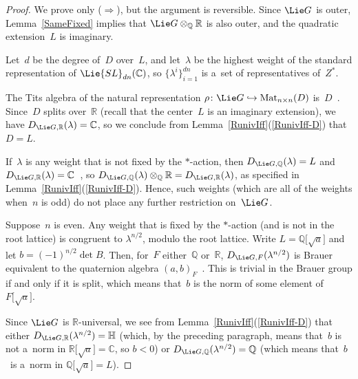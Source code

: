 \documentclass[pdftex]{sigma}
\DeclareMathOperator{\Mat}{Mat}
\numberwithin{equation}{section}
\begin{document}
\begin{proof}
We prove only ($\Rightarrow$), but the argument is reversible.
Since $\Lie G$ is outer, Lemma~\ref{SameFixed} implies that $\Lie G \otimes_\mathbb{Q} \mathbb{R}$ is also outer, and the
quadratic extension~$L$ is imaginary.

Let~$d$ be the degree of~$D$ over~$L$, and let~$\lambda$ be the highest weight of the standard representation of
$\Lie{SL}_{dn}(\mathbb{C})$, so $\{\lambda^i\}_{i=1}^{dn}$ is a~set of representatives of~$Z^*$.

The Tits algebra of the natural representation $\rho \colon \Lie G \hookrightarrow \Mat_{n \times n}(D)$
is~$D$~\cite[p.~378]{KnusEtAl-BookOfInvols}.
Since~$D$ splits over~$\mathbb{R}$ (recall that the center~$L$ is an imaginary extension),
we have $D_{\Lie G, \mathbb{R}}(\lambda) = \mathbb{C}$, so we conclude from Lemma~\ref{RunivIff}(\ref{RunivIff-D})
that $D = L$.

If~$\lambda$ is any weight that is not f\/ixed by the $*$-action, then $D_{\Lie G, \mathbb{Q}}(\lambda) = L$ and $D_{\Lie
G, \mathbb{R}}(\lambda) = \mathbb{C}$~\cite[p.~378]{KnusEtAl-BookOfInvols}, so $D_{\Lie G, \mathbb{Q}}(\lambda)
\otimes_\mathbb{Q} \mathbb{R} = D_{\Lie G, \mathbb{R}}(\lambda)$, as specif\/ied in Lemma~\ref{RunivIff}(\ref{RunivIff-D}).
Hence, such weights (which are all of the weights when~$n$ is odd) do not place any further restriction on~$\Lie G$.

Suppose~$n$ is even.
Any weight that is f\/ixed by the $*$-action (and is not in the root lattice) is congruent to $\lambda^{n/2}$, modulo the
root lattice.
Write $L = \mathbb{Q} \bigl[\sqrt{a} \bigr]$ and let $b = (-1)^{n/2} \det B$.
Then, for~$F$ either~$\mathbb{Q}$ or~$\mathbb{R}$, $D_{\Lie G, F}(\lambda^{n/2})$ is Brauer equivalent to the quaternion
algebra $(a,b)_F$~\cite[p.~378 and Corollary~10.35 on p.~131)]{KnusEtAl-BookOfInvols}.
This is trivial in the Brauer group if and only if it is split, which means that~$b$ is the norm of some element of $F
\bigl[\sqrt{a} \bigr]$.

Since $\Lie G$ is $\mathbb{R}$-universal, we see from Lemma~\ref{RunivIff}(\ref{RunivIff-D}) that either $D_{\Lie G,
\mathbb{R}}(\lambda^{n/2}) = \mathbb{H}$ (which, by the preceding paragraph, means that~$b$ is not a~norm in $\mathbb{R}
\bigl[\sqrt{a} \bigr] = \mathbb{C}$, so $b < 0$) or $D_{\Lie G, \mathbb{Q}}(\lambda^{n/2}) = \mathbb{Q}$ (which means
that~$b$~is a~norm in $\mathbb{Q} \bigl[\sqrt{a} \bigr] = L$).
\end{proof}
\end{document}
